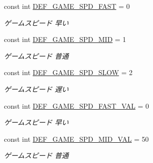 \begin{DoxyCompactItemize}
const int \hyperlink{class_reversi_wpf_1_1_reversi_const_a48b97f9203a9355f396b47c64027c24a}{D\+E\+F\+\_\+\+G\+A\+M\+E\+\_\+\+S\+P\+D\+\_\+\+F\+A\+ST} = 0
\begin{DoxyCompactList}\small\item\em ゲームスピード 早い \end{DoxyCompactList}\item 
\mbox{\label{class_reversi_wpf_1_1_reversi_const_aeca7301a662df9675f1eb85b5e5b010b}} 
const int \hyperlink{class_reversi_wpf_1_1_reversi_const_aeca7301a662df9675f1eb85b5e5b010b}{D\+E\+F\+\_\+\+G\+A\+M\+E\+\_\+\+S\+P\+D\+\_\+\+M\+ID} = 1
\begin{DoxyCompactList}\small\item\em ゲームスピード 普通 \end{DoxyCompactList}\item 
\mbox{\label{class_reversi_wpf_1_1_reversi_const_afe74f9a69b90b84118dd87bf005bfe20}} 
const int \hyperlink{class_reversi_wpf_1_1_reversi_const_afe74f9a69b90b84118dd87bf005bfe20}{D\+E\+F\+\_\+\+G\+A\+M\+E\+\_\+\+S\+P\+D\+\_\+\+S\+L\+OW} = 2
\begin{DoxyCompactList}\small\item\em ゲームスピード 遅い \end{DoxyCompactList}\item 
\mbox{\label{class_reversi_wpf_1_1_reversi_const_ae2585819ca34848d8210fcb88e350973}} 
const int \hyperlink{class_reversi_wpf_1_1_reversi_const_ae2585819ca34848d8210fcb88e350973}{D\+E\+F\+\_\+\+G\+A\+M\+E\+\_\+\+S\+P\+D\+\_\+\+F\+A\+S\+T\+\_\+\+V\+AL} = 0
\begin{DoxyCompactList}\small\item\em ゲームスピード 早い \end{DoxyCompactList}\item 
\mbox{\label{class_reversi_wpf_1_1_reversi_const_a51e3ebd11feb1dd8b7bd72dceebc709a}} 
const int \hyperlink{class_reversi_wpf_1_1_reversi_const_a51e3ebd11feb1dd8b7bd72dceebc709a}{D\+E\+F\+\_\+\+G\+A\+M\+E\+\_\+\+S\+P\+D\+\_\+\+M\+I\+D\+\_\+\+V\+AL} = 50
\begin{DoxyCompactList}\small\item\em ゲームスピード 普通 \end{DoxyCompactList}\item 

\end{DoxyCompactItemize}
